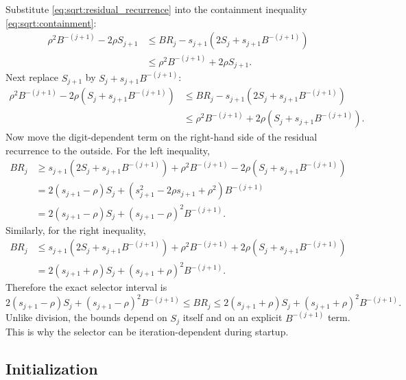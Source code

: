\documentclass[11pt]{article}
\numberwithin{equation}{section}
\begin{document}
Substitute \cref{eq:sqrt:residual_recurrence} into the containment inequality
\cref{eq:sqrt:containment}:
\begin{align}
  \rho^2B^{-(j+1)} - 2\rho S_{j+1}
  &\le BR_j - s_{j+1}\left(2S_j+s_{j+1}B^{-(j+1)}\right) \nonumber \\
  &\le \rho^2B^{-(j+1)} + 2\rho S_{j+1}.
  \label{eq:sqrt:selection_sub1}
\end{align}
Next replace $S_{j+1}$ by $S_j+s_{j+1}B^{-(j+1)}$:
\begin{align}
  \rho^2B^{-(j+1)} - 2\rho\left(S_j+s_{j+1}B^{-(j+1)}\right)
  &\le BR_j - s_{j+1}\left(2S_j+s_{j+1}B^{-(j+1)}\right) \nonumber \\
  &\le \rho^2B^{-(j+1)} + 2\rho\left(S_j+s_{j+1}B^{-(j+1)}\right).
  \label{eq:sqrt:selection_sub2}
\end{align}
Now move the digit-dependent term on the right-hand side of the residual recurrence to the outside.
For the left inequality,
\begin{align*}
  BR_j
  &\ge s_{j+1}\left(2S_j+s_{j+1}B^{-(j+1)}\right)
     + \rho^2B^{-(j+1)} - 2\rho\left(S_j+s_{j+1}B^{-(j+1)}\right) \\
  &= 2(s_{j+1}-\rho)S_j + \left(s_{j+1}^2 - 2\rho s_{j+1} + \rho^2\right)B^{-(j+1)} \\
  &= 2(s_{j+1}-\rho)S_j + (s_{j+1}-\rho)^2B^{-(j+1)}.
\end{align*}
Similarly, for the right inequality,
\begin{align*}
  BR_j
  &\le s_{j+1}\left(2S_j+s_{j+1}B^{-(j+1)}\right)
     + \rho^2B^{-(j+1)} + 2\rho\left(S_j+s_{j+1}B^{-(j+1)}\right) \\
  &= 2(s_{j+1}+\rho)S_j + (s_{j+1}+\rho)^2B^{-(j+1)}.
\end{align*}
Therefore the exact selector interval is
\begin{equation}
  \label{eq:sqrt:selection_interval}
  2(s_{j+1}-\rho)S_j + (s_{j+1}-\rho)^2B^{-(j+1)}
  \le BR_j \le
  2(s_{j+1}+\rho)S_j + (s_{j+1}+\rho)^2B^{-(j+1)}.
\end{equation}
Unlike division, the bounds depend on $S_j$ itself and on an explicit $B^{-(j+1)}$ term.
This is why the selector can be iteration-dependent during startup.

\subsection{Initialization}
\label{ssec:sqrt:init}
\end{document}
